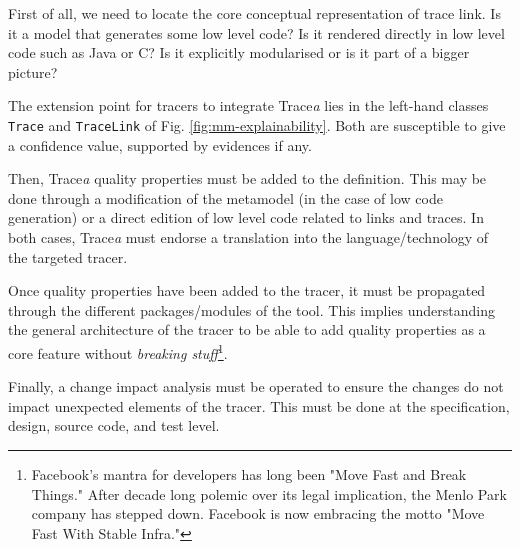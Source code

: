 \begin{descriptioncompact}
    \item[1 - Localisation] First of all, we need to locate the core conceptual representation of trace link. Is it a model that generates some low level code? Is it rendered directly in low level code such as Java or C? Is it explicitly modularised or is it part of a bigger picture?
    
    
    The extension point for tracers to integrate Trace\textit{a} lies in the left-hand classes \texttt{Trace} and \texttt{TraceLink} of Fig. \ref{fig:mm-explainability}. Both are susceptible to give a confidence value, supported by evidences if any. 
    
    
    \item[2 - Injection] Then, Trace\textit{a} quality properties must be added to the definition. This may be done through a modification of the metamodel (in the case of low code generation) or a direct edition of low level code related to links and traces. In both cases, Trace\textit{a} must endorse a translation into the language/technology of the targeted tracer.
    
    
    
    \item[3 - Interfacing] Once quality properties have been added to the tracer, it must be propagated through the different packages/modules of the tool. This implies understanding the general architecture of the tracer to be able to add quality properties as a core feature without \textit{breaking stuff}\footnote{Facebook's mantra for developers has long been "Move Fast and Break Things." After decade long polemic over its legal implication, the Menlo Park company has stepped down. Facebook is now embracing the motto "Move Fast With Stable Infra." }.
    
    \item[4 - Change impact] Finally, a change impact analysis must be operated to ensure the changes do not impact unexpected elements of the tracer. This must be done at the specification, design, source code, and test level.
\end{descriptioncompact}



